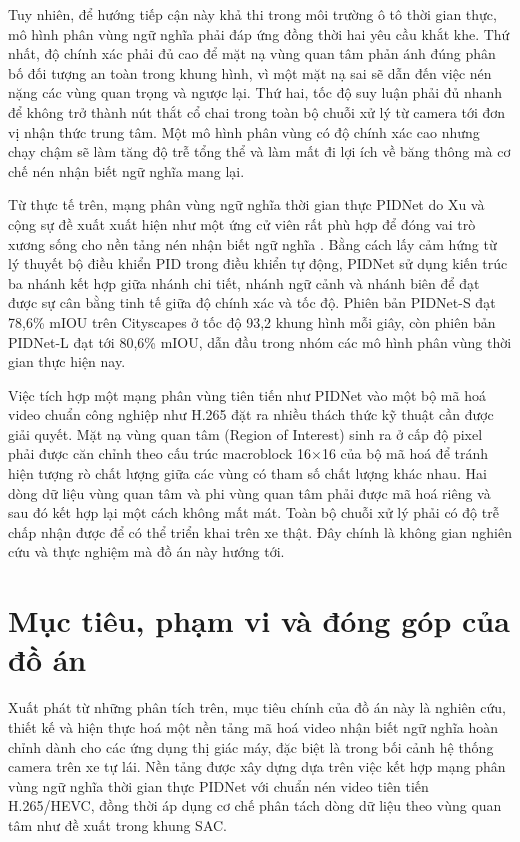 Tuy nhiên, để hướng tiếp cận này khả thi trong môi trường ô tô thời gian thực, mô hình phân vùng ngữ nghĩa phải đáp ứng đồng thời hai yêu cầu khắt khe. Thứ nhất, độ chính xác phải đủ cao để mặt nạ vùng quan tâm phản ánh đúng phân bố đối tượng an toàn trong khung hình, vì một mặt nạ sai sẽ dẫn đến việc nén nặng các vùng quan trọng và ngược lại. Thứ hai, tốc độ suy luận phải đủ nhanh để không trở thành nút thắt cổ chai trong toàn bộ chuỗi xử lý từ camera tới đơn vị nhận thức trung tâm. Một mô hình phân vùng có độ chính xác cao nhưng chạy chậm sẽ làm tăng độ trễ tổng thể và làm mất đi lợi ích về băng thông mà cơ chế nén nhận biết ngữ nghĩa mang lại.

Từ thực tế trên, mạng phân vùng ngữ nghĩa thời gian thực PIDNet do Xu và cộng sự đề xuất xuất hiện như một ứng cử viên rất phù hợp để đóng vai trò xương sống cho nền tảng nén nhận biết ngữ nghĩa \cite{PID}. Bằng cách lấy cảm hứng từ lý thuyết bộ điều khiển PID trong điều khiển tự động, PIDNet sử dụng kiến trúc ba nhánh kết hợp giữa nhánh chi tiết, nhánh ngữ cảnh và nhánh biên để đạt được sự cân bằng tinh tế giữa độ chính xác và tốc độ. Phiên bản PIDNet-S đạt 78,6\% mIOU trên Cityscapes ở tốc độ 93,2 khung hình mỗi giây, còn phiên bản PIDNet-L đạt tới 80,6\% mIOU, dẫn đầu trong nhóm các mô hình phân vùng thời gian thực hiện nay.

Việc tích hợp một mạng phân vùng tiên tiến như PIDNet vào một bộ mã hoá video chuẩn công nghiệp như H.265 đặt ra nhiều thách thức kỹ thuật cần được giải quyết. Mặt nạ vùng quan tâm (Region of Interest) sinh ra ở cấp độ pixel phải được căn chỉnh theo cấu trúc macroblock 16$\times$16 của bộ mã hoá để tránh hiện tượng rò chất lượng giữa các vùng có tham số chất lượng khác nhau. Hai dòng dữ liệu vùng quan tâm và phi vùng quan tâm phải được mã hoá riêng và sau đó kết hợp lại một cách không mất mát. Toàn bộ chuỗi xử lý phải có độ trễ chấp nhận được để có thể triển khai trên xe thật. Đây chính là không gian nghiên cứu và thực nghiệm mà đồ án này hướng tới.

\section{Mục tiêu, phạm vi và đóng góp của đồ án}

Xuất phát từ những phân tích trên, mục tiêu chính của đồ án này là nghiên cứu, thiết kế và hiện thực hoá một nền tảng mã hoá video nhận biết ngữ nghĩa hoàn chỉnh dành cho các ứng dụng thị giác máy, đặc biệt là trong bối cảnh hệ thống camera trên xe tự lái. Nền tảng được xây dựng dựa trên việc kết hợp mạng phân vùng ngữ nghĩa thời gian thực PIDNet với chuẩn nén video tiên tiến H.265/HEVC, đồng thời áp dụng cơ chế phân tách dòng dữ liệu theo vùng quan tâm như đề xuất trong khung SAC.

